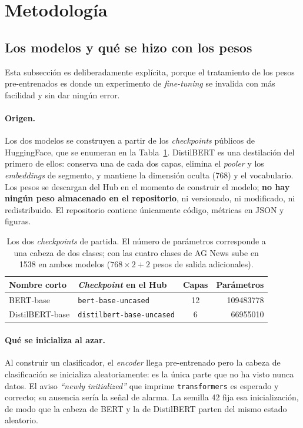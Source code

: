 \section{Metodología}
\label{sec:metodologia}

\subsection{Los modelos y qué se hizo con los pesos}
\label{sec:pesos}

Esta subsección es deliberadamente explícita, porque el tratamiento de los
pesos pre-entrenados es donde un experimento de \textit{fine-tuning} se
invalida con más facilidad y sin dar ningún error.

\paragraph{Origen.} Los dos modelos se construyen a partir de los
\textit{checkpoints} públicos de HuggingFace, que se enumeran en la
Tabla~\ref{tab:modelos}. DistilBERT es una destilación del primero de ellos:
conserva una de cada dos capas, elimina el \textit{pooler} y los
\textit{embeddings} de segmento, y mantiene la dimensión oculta (768) y el
vocabulario. Los pesos se descargan del Hub en el momento de construir el
modelo; \textbf{no hay ningún peso almacenado en el repositorio}, ni
versionado, ni modificado, ni redistribuido. El repositorio contiene
únicamente código, métricas en JSON y figuras.

\begin{table}[h]
\centering
\small
\begin{tabular}{llcr}
\toprule
\textbf{Nombre corto} & \textbf{\textit{Checkpoint} en el Hub} &
\textbf{Capas} & \textbf{Parámetros} \\
\midrule
BERT-base       & \texttt{bert-base-uncased}       & 12 & \num{109483778} \\
DistilBERT-base & \texttt{distilbert-base-uncased} &  6 & \num{66955010}  \\
\bottomrule
\end{tabular}
\caption{Los dos \textit{checkpoints} de partida. El número de parámetros
corresponde a una cabeza de dos clases; con las cuatro clases de AG News
sube en \num{1538} en ambos modelos ($768 \times 2 + 2$ pesos de salida
adicionales).}
\label{tab:modelos}
\end{table}

\paragraph{Qué se inicializa al azar.} Al construir un clasificador, el
\textit{encoder} llega pre-entrenado pero la cabeza de clasificación se
inicializa aleatoriamente: es la única parte que no ha visto nunca datos. El
aviso \textit{``newly initialized''} que imprime \texttt{transformers} es
esperado y correcto; su ausencia sería la señal de alarma. La semilla 42 fija
esa inicialización, de modo que la cabeza de BERT y la de DistilBERT parten
del mismo estado aleatorio.


